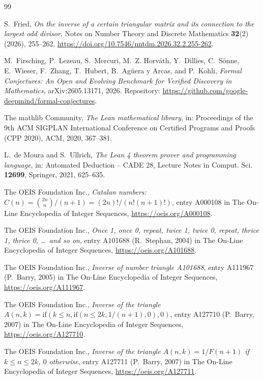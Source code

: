 \documentclass[11pt]{amsart}
\theoremstyle{plain}
\theoremstyle{definition}
\begin{document}
{\footnotesize
\begin{thebibliography}{99}

S.~Fried, \emph{On the inverse of a certain triangular matrix and its connection to the largest odd divisor}, Notes on Number Theory and Discrete Mathematics \textbf{32}(2) (2026), 255--262, \url{https://doi.org/10.7546/nntdm.2026.32.2.255-262}.

M.~Firsching, P.~Lezeau, S.~Mercuri, M.~Z. Horv\'ath, Y.~Dillies, C.~S\"onne, E.~Wieser, F.~Zhang, T.~Hubert, B.~Ag\"uera y Arcas, and P.~Kohli, \emph{Formal Conjectures: An Open and Evolving Benchmark for Verified Discovery in Mathematics}, arXiv:2605.13171, 2026. Repository: \url{https://github.com/google-deepmind/formal-conjectures}.

The mathlib Community, \emph{The Lean mathematical library}, in: Proceedings of the 9th ACM SIGPLAN International Conference on Certified Programs and Proofs (CPP 2020), ACM, 2020, 367--381.

L.~de Moura and S.~Ullrich, \emph{The Lean 4 theorem prover and programming language}, in: Automated Deduction -- CADE 28, Lecture Notes in Comput. Sci. \textbf{12699}, Springer, 2021, 625--635.

The OEIS Foundation Inc., \emph{Catalan numbers: $C(n)=\binom{2n}{n}/(n+1)=(2n)!/(n!(n+1)!)$}, entry A000108 in The On-Line Encyclopedia of Integer Sequences, \url{https://oeis.org/A000108}.

The OEIS Foundation Inc., \emph{Once 1, once 0, repeat, twice 1, twice 0, repeat, thrice 1, thrice 0, \ldots\ and so on}, entry A101688 (R.~Stephan, 2004) in The On-Line Encyclopedia of Integer Sequences, \url{https://oeis.org/A101688}.

The OEIS Foundation Inc., \emph{Inverse of number triangle A101688}, entry A111967 (P.~Barry, 2005) in The On-Line Encyclopedia of Integer Sequences, \url{https://oeis.org/A111967}.

The OEIS Foundation Inc., \emph{Inverse of the triangle $A(n,k)=\mathrm{if}(k\le n,\mathrm{if}(n\le 2k,1/(n+1),0),0)$}, entry A127710 (P.~Barry, 2007) in The On-Line Encyclopedia of Integer Sequences, \url{https://oeis.org/A127710}.

The OEIS Foundation Inc., \emph{Inverse of the triangle $A(n,k)=1/F(n+1)$ if $k\le n\le 2k$, $0$ otherwise}, entry A127711 (P.~Barry, 2007) in The On-Line Encyclopedia of Integer Sequences, \url{https://oeis.org/A127711}.


\end{thebibliography}}
\end{document}
